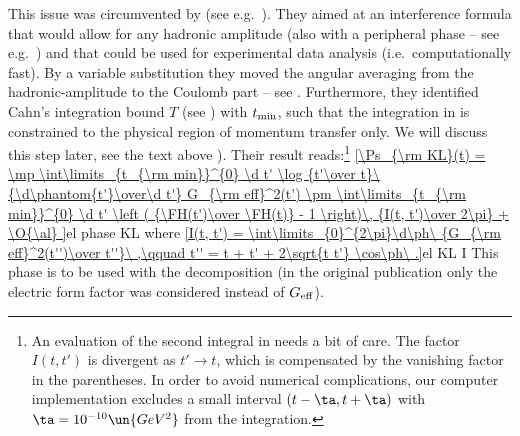 
This issue was circumvented by \KaL{} (see e.g.~). They aimed at an interference formula that would allow for any hadronic amplitude (also with a peripheral phase -- see e.g.~) and that could be used for experimental data analysis (i.e.~computationally fast). By a variable substitution they moved the angular averaging from the hadronic-amplitude to the Coulomb part -- see . Furthermore, they identified Cahn's integration bound $T$ (see ) with $t_{\rm min}$, such that the integration in  is constrained to the physical region of momentum transfer only. We will discuss this step later, see the text above ). Their result reads:\footnote{%
An evaluation of the second integral in  needs a bit of care. The factor $I(t, t')$ is divergent as $t'\to t$, which is compensated by the vanishing factor in the parentheses. In order to avoid numerical complications, our computer implementation excludes a small interval $(t-\ta, t+\ta)$ with $\ta = 10^{-10}\un{GeV^2}$ from the integration.
}
\eqref{\Ps_{\rm KL}(t) =
	\mp \int\limits_{t_{\rm min}}^{0} \d t' \log {t'\over t}\ {\d\phantom{t'}\over\d t'} G_{\rm eff}^2(t')
	\pm \int\limits_{t_{\rm min}}^{0} \d t' \left ( {\FH(t')\over \FH(t)} - 1 \right)\, {I(t, t')\over 2\pi}
	+ \O{\al}
}{el phase KL}
where
\eqref{I(t, t') = \int\limits_{0}^{2\pi}\d\ph\ {G_{\rm eff}^2(t'')\over t''}\ ,\qquad t'' = t + t' + 2\sqrt{t t'} \cos\ph\ .}{el KL I}
This phase is to be used with the decomposition  (in the original publication  only the electric form factor was considered instead of $G_{\rm eff}$).


